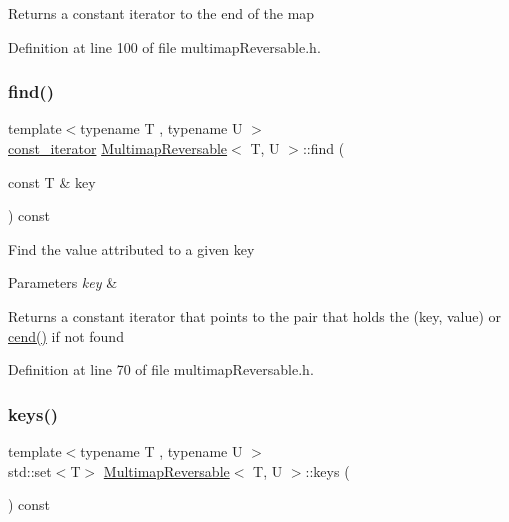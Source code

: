\begin{DoxyReturn}{Returns}
a constant iterator to the end of the map 
\end{DoxyReturn}


Definition at line 100 of file multimap\+Reversable.\+h.

\mbox{\label{classMultimapReversable_a03a9ce69713f3bf4c9b91964cc268e10}} 
\subsubsection{\texorpdfstring{find()}{find()}}
{\footnotesize\ttfamily template$<$typename T , typename U $>$ \\
\hyperlink{classMultimapReversable_ac747a36aa9a030bec3d2149d97047de5}{const\+\_\+iterator} \hyperlink{classMultimapReversable}{Multimap\+Reversable}$<$ T, U $>$\+::find (\begin{DoxyParamCaption}\item[{const T \&}]{key }\end{DoxyParamCaption}) const\hspace{0.3cm}{\ttfamily [inline]}}

Find the value attributed to a given key 
\begin{DoxyParams}{Parameters}
{\em key} & \\
\hline
\end{DoxyParams}
\begin{DoxyReturn}{Returns}
a constant iterator that points to the pair that holds the (key, value) or \hyperlink{classMultimapReversable_a61a87bb3d33488b80d46fbbeffa2b91e}{cend()} if not found 
\end{DoxyReturn}


Definition at line 70 of file multimap\+Reversable.\+h.

\mbox{\label{classMultimapReversable_a135171aef1cc98eb99df8eb63843e4da}} 
\subsubsection{\texorpdfstring{keys()}{keys()}\hspace{0.1cm}{\footnotesize\ttfamily [1/2]}}
{\footnotesize\ttfamily template$<$typename T , typename U $>$ \\
std\+::set$<$T$>$ \hyperlink{classMultimapReversable}{Multimap\+Reversable}$<$ T, U $>$\+::keys (\begin{DoxyParamCaption}{ }\end{DoxyParamCaption}) const\hspace{0.3cm}{\ttfamily [inline]}}

